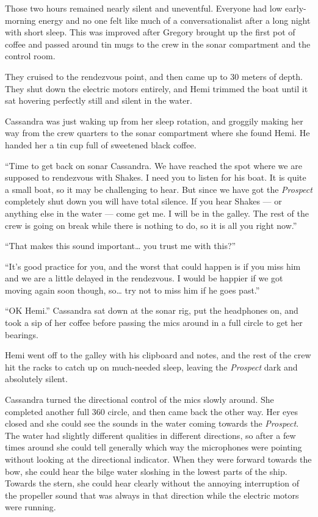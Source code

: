 \documentclass[
]{scrbook}
\begin{document}
Those two hours remained nearly silent and uneventful. Everyone had low
early-morning energy and no one felt like much of a conversationalist
after a long night with short sleep. This was improved after Gregory
brought up the first pot of coffee and passed around tin mugs to the
crew in the sonar compartment and the control room.

They cruised to the rendezvous point, and then came up to 30 meters of
depth. They shut down the electric motors entirely, and Hemi trimmed the
boat until it sat hovering perfectly still and silent in the water.

Cassandra was just waking up from her sleep rotation, and groggily
making her way from the crew quarters to the sonar compartment where she
found Hemi. He handed her a tin cup full of sweetened black coffee.

``Time to get back on sonar Cassandra. We have reached the spot where we
are supposed to rendezvous with Shakes. I need you to listen for his
boat. It is quite a small boat, so it may be challenging to hear. But
since we have got the \emph{Prospect} completely shut down you will have
total silence. If you hear Shakes --- or anything else in the water ---
come get me. I will be in the galley. The rest of the crew is going on
break while there is nothing to do, so it is all you right now.''

``That makes this sound important\ldots{} you trust me with this?''

``It's good practice for you, and the worst that could happen is if you
miss him and we are a little delayed in the rendezvous. I would be
happier if we got moving again soon though, so\ldots{} try not to miss
him if he goes past.''

``OK Hemi.'' Cassandra sat down at the sonar rig, put the headphones on,
and took a sip of her coffee before passing the mics around in a full
circle to get her bearings.

Hemi went off to the galley with his clipboard and notes, and the rest
of the crew hit the racks to catch up on much-needed sleep, leaving the
\emph{Prospect} dark and absolutely silent.

Cassandra turned the directional control of the mics slowly around. She
completed another full 360 circle, and then came back the other way. Her
eyes closed and she could see the sounds in the water coming towards the
\emph{Prospect}. The water had slightly different qualities in different
directions, so after a few times around she could tell generally which
way the microphones were pointing without looking at the directional
indicator. When they were forward towards the bow, she could hear the
bilge water sloshing in the lowest parts of the ship. Towards the stern,
she could hear clearly without the annoying interruption of the
propeller sound that was always in that direction while the electric
motors were running.
\end{document}
